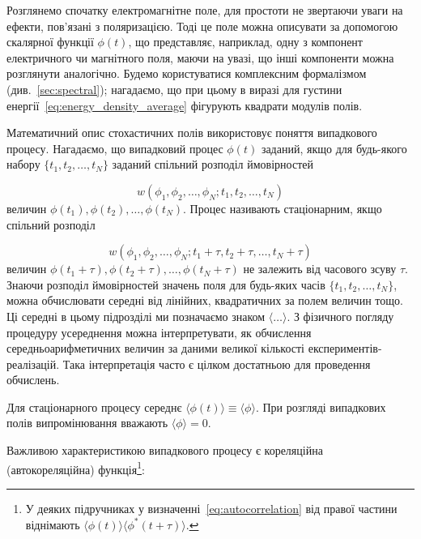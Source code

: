 Розглянемо спочатку електромагнітне поле, для простоти не звертаючи уваги на ефекти, пов'язані з поляризацією. Тоді це
поле можна описувати за допомогою скалярної функції \(\phi(t)\), що представляє, наприклад, одну з компонент
електричного чи магнітного поля, маючи на увазі, що інші компоненти можна розглянути аналогічно. Будемо користуватися
комплексним формалізмом (див.~\ref{sec:spectral}); нагадаємо, що при цьому в виразі для густини
енергії~\eqref{eq:energy_density_average} фігурують квадрати модулів полів.

Математичний опис стохастичних полів використовує поняття випадкового процесу. Нагадаємо, що випадковий процес
\(\phi(t)\) заданий, якщо для будь-якого набору \(\{t_1, t_2, \dots, t_N\}\) заданий спільний розподіл ймовірностей

\begin{equation*}
	w(\phi_1, \phi_2, \dots, \phi_N; t_1, t_2, \dots, t_N)
\end{equation*}
величин \(\phi(t_1), \phi(t_2), \dots, \phi(t_N)\). Процес називають стаціонарним, якщо спільний розподіл

\begin{equation*}
	w(\phi_1, \phi_2, \dots, \phi_N; t_1 + \tau, t_2 + \tau, \dots, t_N + \tau)
\end{equation*}
%
величин \(\phi(t_1 + \tau), \phi(t_2 + \tau), \dots, \phi(t_N + \tau)\) не залежить від часового зсуву \(\tau\). Знаючи
розподіл ймовірностей значень поля для будь-яких часів \(\{t_1, t_2, \dots, t_N\}\), можна обчислювати середні від
лінійних, квадратичних за полем величин тощо. Ці середні в цьому підрозділі ми позначаємо знаком \(\langle \dots
\rangle\). З фізичного погляду процедуру усереднення можна інтерпретувати, як обчислення середньоарифметичних величин за
даними великої кількості експериментів-реалізацій. Така інтерпретація часто є цілком достатньою для проведення
обчислень.

Для стаціонарного процесу середнє \(\langle \phi(t) \rangle \equiv \langle \phi \rangle\). При розгляді випадкових полів
випромінювання вважають \(\langle \phi \rangle = 0\).

Важливою характеристикою випадкового процесу є кореляційна (автокореляційна) функція\footnote{У
	деяких підручниках у визначенні~\eqref{eq:autocorrelation} від правої частини віднімають \(\langle \phi(t) \rangle
	\langle \phi^{*}(t + \tau) \rangle\).}:

